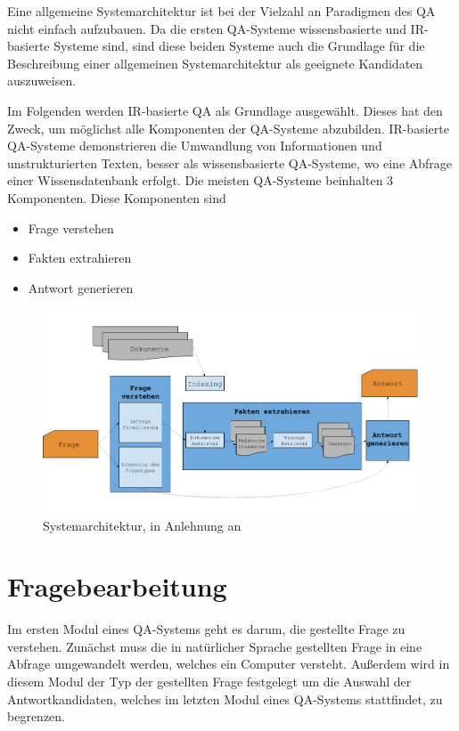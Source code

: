 Eine allgemeine Systemarchitektur ist bei der Vielzahl an Paradigmen des QA nicht einfach aufzubauen. Da die ersten QA-Systeme wissensbasierte und IR-basierte Systeme sind, sind diese beiden Systeme auch die Grundlage für die Beschreibung einer allgemeinen Systemarchitektur als geeignete Kandidaten auszuweisen. 

Im Folgenden werden IR-basierte QA als Grundlage ausgewählt. Dieses hat den Zweck, um möglichst alle Komponenten der QA-Systeme abzubilden. IR-basierte QA-Systeme demonstrieren die Umwandlung von Informationen und unstrukturierten Texten, besser als wissensbasierte QA-Systeme, wo eine Abfrage einer Wissensdatenbank erfolgt. Die meisten QA-Systeme beinhalten 3 Komponenten. Diese Komponenten sind 
\begin{itemize}
\item Frage verstehen
\item Fakten extrahieren 
\item Antwort generieren
\end{itemize}




\begin{figure}[H]
    \centering\includegraphics[width=1.0\linewidth]{images/image1.png}
    \caption[Systemarchitektur]{Systemarchitektur, in Anlehnung an \cite []{eff70}}
    \label{fig:diagram1}
\end{figure}





\section{Fragebearbeitung}

Im ersten Modul eines QA-Systems geht es darum, die gestellte Frage zu verstehen. Zunächst muss die in natürlicher Sprache gestellten Frage in eine Abfrage umgewandelt werden, welches ein Computer versteht. Außerdem wird in diesem Modul der Typ der gestellten Frage festgelegt um die Auswahl der Antwortkandidaten, welches im letzten Modul eines QA-Systems stattfindet, zu begrenzen.

